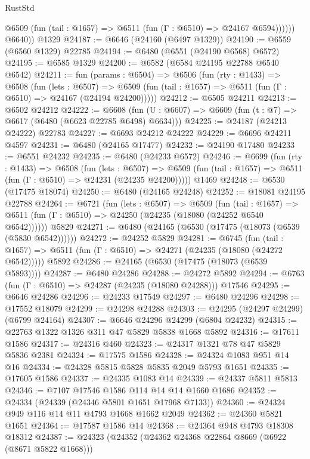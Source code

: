 \begin{lexlean}{RustStd}
\begin{coremodule}
              @6509 (fun (tail : @1657) => @6511 (fun (Γ : @6510) => @24167 @6594))))))
        @6640))
    @1329
@24187 := @6646 (@24160 (@6497 @1329))
@24190 := @6559 (@6560 @1329) @22785
@24194 := @6480 (@6551 (@24190 @6568) @6572)
@24195 := @6585 @1329
@24200 := @6582 (@6584 @24195 @22788 @6540 @6542)
@24211 := fun (params : @6504) =>
  @6506
    (fun (rty : @1433) =>
    @6508
      (fun (lets : @6507) =>
      @6509 (fun (tail : @1657) => @6511 (fun (Γ : @6510) => @24167 (@24194 @24200)))))
@24212 := @6505 @24211
@24213 := @6502 @24212
@24222 := @6608
    (fun (U : @6607) => @6609 (fun (t : @7) => @6617 (@6480 (@6623 @22785 @6498) @6634)))
@24225 := @24187 (@24213 @24222) @22783
@24227 := @6693 @24212 @24222
@24229 := @6696 @24211 @4597
@24231 := @6480 (@24165 @17477)
@24232 := @24190 @17480
@24233 := @6551 @24232
@24235 := @6480 (@24233 @6572)
@24246 := @6699
    (fun (rty : @1433) =>
    @6508
      (fun (lets : @6507) =>
      @6509 (fun (tail : @1657) => @6511 (fun (Γ : @6510) => @24231 (@24235 @24200)))))
    @1469
@24248 := @6530 (@17475 @18074)
@24250 := @6480 (@24165 @24248)
@24252 := @18081 @24195 @22788
@24264 := @6721
    (fun (lets : @6507) =>
    @6509
      (fun (tail : @1657) =>
      @6511 (fun (Γ : @6510) => @24250 (@24235 (@18080 (@24252 @6540 @6542))))))
    @5829
@24271 := @6480 (@24165 (@6530 (@17475 (@18073 (@6539 (@5830 @6542))))))
@24272 := @24252 @5829
@24281 := @6745
    (fun (tail : @1657) => @6511 (fun (Γ : @6510) => @24271 (@24235 (@18080 (@24272 @6542)))))
    @5892
@24286 := @24165 (@6530 (@17475 (@18073 (@6539 @5893))))
@24287 := @6480 @24286
@24288 := @24272 @5892
@24294 := @6763 (fun (Γ : @6510) => @24287 (@24235 (@18080 @24288))) @17546
@24295 := @6646 @24286
@24296 := @24233 @17549
@24297 := @6480 @24296
@24298 := @17552 @18079
@24299 := @24298 @24288
@24303 := @24295 (@24297 @24299) (@6799 @24164)
@24307 := @6646 @24296 @24299 (@6804 @24232)
@24315 := @22763 @1322 @1326 @311 @47 @5829 @5838 @1668 @5892
@24316 := @17611 @1586
@24317 := @24316 @460
@24323 := @24317 @1321 @78 @47 @5829 @5836 @2381
@24324 := @17575 @1586
@24328 := @24324 @1083 @951 @14 @16
@24334 := @24328 @5815 @5828 @5835 @2049 @5793 @1651
@24335 := @17605 @1586
@24337 := @24335 @1083 @14
@24339 := @24337 @5811 @5813
@24346 := @7107 @17546 @1586 @114 @14 @14 @1660 @1686
@24352 := @24334 (@24339 (@24346 @5801 @1651 @17968 @7133))
@24360 := @24324 @949 @116 @14 @11 @4793 @1668 @1662 @2049
@24362 := @24360 @5821 @1651
@24364 := @17587 @1586 @14
@24368 := @24364 @948 @4793 @18308 @18312
@24387 := @24323
    (@24352
      (@24362 @24368 @22864 @8669 (@6922 (@8671 @5822 @1668)))

\end{coremodule}
\end{lexlean}
